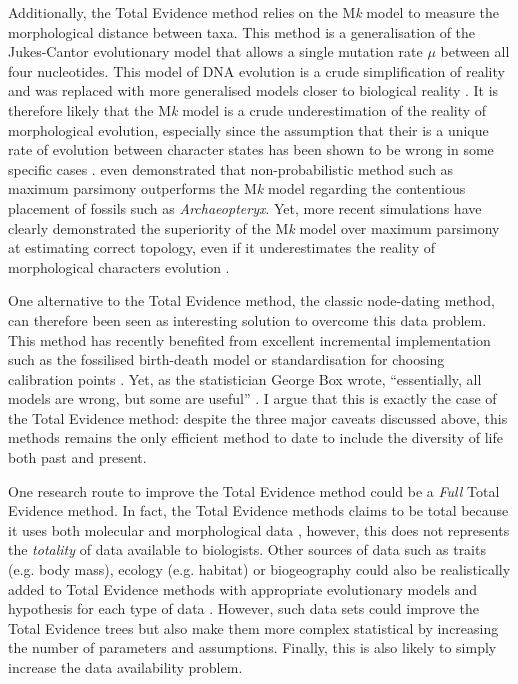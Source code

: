 Additionally, the Total Evidence method relies on the M\textit{k} model \citep{lewisa2001} to measure the morphological distance between taxa.
This method is a generalisation of the Jukes-Cantor evolutionary model \citep{jukes1969evolution} that allows a single mutation rate $\mu$ between all four nucleotides.
This model of DNA evolution is a crude simplification of reality and was replaced with more generalised models closer to biological reality \citep[e.g. the GTR model allowing a different rate for each mutation;][]{tavare1986}.
It is therefore likely that the M\textit{k} model is a crude underestimation of the reality of morphological evolution, especially since the assumption that their is a unique rate of evolution between character states has been shown to be wrong in some specific cases \citep[e.g. for Dollo traits;][]{WrightDollo}.
\cite{spencerefficacy2013} even demonstrated that non-probabilistic method such as maximum parsimony outperforms the M\textit{k} model regarding the contentious placement of fossils such as \textit{Archaeopteryx}.
Yet, more recent simulations have clearly demonstrated the superiority of the M\textit{k} model over maximum parsimony at estimating correct topology, even if it underestimates the reality of morphological characters evolution \citep{wrightbayesian2014}.

One alternative to the Total Evidence method, the classic node-dating method, can therefore been seen as interesting solution to overcome this data problem.
This method has recently benefited from excellent incremental implementation such as the fossilised birth-death model \citep{heaththe2013} or standardisation for choosing calibration points \citep{Parham01032012}.
Yet, as the statistician George Box wrote, ``essentially, all models are wrong, but some are useful'' \citep{box1987empirical}.
I argue that this is exactly the case of the Total Evidence method: despite the three major caveats discussed above, this methods remains the only efficient method to date to include the diversity of life both past and present.

One research route to improve the Total Evidence method could be a \textit{Full} Total Evidence method.
In fact, the Total Evidence methods claims to be total because it uses both molecular and morphological data \citep{eernissetaxonomic1993}, however, this does not represents the \textit{totality} of data available to biologists.
Other sources of data such as traits (e.g. body mass), ecology (e.g. habitat) or biogeography could also be realistically added to Total Evidence methods with appropriate evolutionary models and hypothesis for each type of data \citep[e.g. respectively quantitative, multiple or geographic state speciation and extinction model - Qua-Mu-GeoSSE models;][]{fitzjohndiversitree2012}.
However, such data sets could improve the Total Evidence trees but also make them more complex statistical by increasing the number of parameters and assumptions.
Finally, this is also likely to simply increase the data availability problem.


